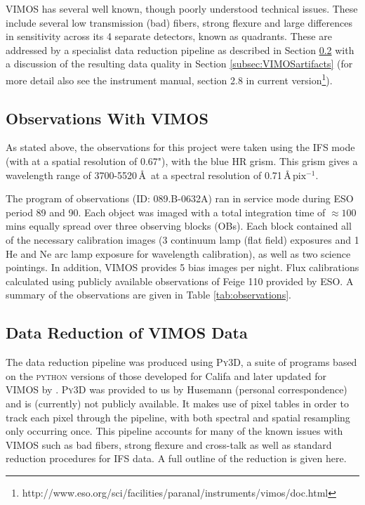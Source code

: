 		VIMOS has several well known, though poorly understood technical issues. These include several low transmission (bad) fibers, strong flexure and large differences in sensitivity across its 4 separate detectors, known as quadrants. These are addressed by a specialist data reduction pipeline as described in Section \ref{subsec:VIMOSreduction} with a discussion of the resulting data quality in Section \ref{subsec:VIMOSartifacts} (for more detail also see the instrument manual, section 2.8 in current version\footnote{http://www.eso.org/sci/facilities/paranal/instruments/vimos/doc.html}).

	\subsection{Observations With VIMOS}
		As stated above, the observations for this project were taken using the IFS mode (with at a spatial resolution of 0.67"), with the blue HR grism. This grism gives a wavelength range of 3700-5520\,\AA\ at a spectral resolution of 0.71\,\AA\,$\mathrm{pix^{-1}}$. 

		The program of observations (ID: 089.B-0632A) ran in service mode during ESO period 89 and 90. Each object was imaged with a total integration time of $\approx 100$ mins equally spread over three observing blocks (OBs). Each block contained all of the necessary calibration images (3 continuum lamp (flat field) exposures and 1 He and Ne arc lamp exposure for wavelength calibration), as well as two science pointings. In addition, VIMOS provides 5 bias images per night. Flux calibrations calculated using publicly available observations of Feige 110 provided by ESO. A summary of the observations are given in Table \ref{tab:observations}.

		


	\subsection{Data Reduction of VIMOS Data}
		\label{subsec:VIMOSreduction}
		The data reduction pipeline was produced using \textsc{Py3D}, a suite of programs based on the \textsc{python} versions of those developed for Califa \citep{Sanchez2012, Husemann2013} and later updated for VIMOS by \citet{Husemann2014}. \textsc{Py3D} was provided to us by Husemann (personal correspondence) and is (currently) not publicly available. It  makes use of pixel tables in order to track each pixel through the pipeline, with both spectral and spatial resampling only occurring once. This pipeline accounts for many of the known issues with VIMOS such as bad fibers, strong flexure and cross-talk as well as standard reduction procedures for IFS data. A full outline of the reduction is given here.

